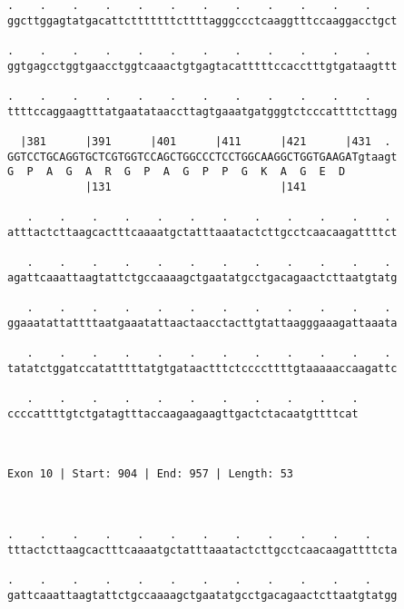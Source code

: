 \documentclass{article}
\begin{document}
\begin{Verbatim}
.    .    .    .    .    .    .    .    .    .    .    .    
ggcttggagtatgacattctttttttcttttagggccctcaaggtttccaaggacctgct
                                                            
.    .    .    .    .    .    .    .    .    .    .    .    
ggtgagcctggtgaacctggtcaaactgtgagtacatttttccacctttgtgataagttt
                                                            
.    .    .    .    .    .    .    .    .    .    .    .    
ttttccaggaagtttatgaatataaccttagtgaaatgatgggtctcccattttcttagg
                                                            
  |381      |391      |401      |411      |421      |431  . 
GGTCCTGCAGGTGCTCGTGGTCCAGCTGGCCCTCCTGGCAAGGCTGGTGAAGATgtaagt
G  P  A  G  A  R  G  P  A  G  P  P  G  K  A  G  E  D        
            |131                          |141              
  
   .    .    .    .    .    .    .    .    .    .    .    . 
atttactcttaagcactttcaaaatgctatttaaatactcttgcctcaacaagattttct
                                                            
   .    .    .    .    .    .    .    .    .    .    .    . 
agattcaaattaagtattctgccaaaagctgaatatgcctgacagaactcttaatgtatg
                                                            
   .    .    .    .    .    .    .    .    .    .    .    . 
ggaaatattattttaatgaaatattaactaacctacttgtattaagggaaagattaaata
                                                            
   .    .    .    .    .    .    .    .    .    .    .    . 
tatatctggatccatatttttatgtgataactttctccccttttgtaaaaaccaagattc
                                                            
   .    .    .    .    .    .    .    .    .    .    .
ccccattttgtctgatagtttaccaagaagaagttgactctacaatgttttcat
                                                      
                                                      
 
Exon 10 | Start: 904 | End: 957 | Length: 53



.    .    .    .    .    .    .    .    .    .    .    .    
tttactcttaagcactttcaaaatgctatttaaatactcttgcctcaacaagattttcta
                                                            
.    .    .    .    .    .    .    .    .    .    .    .    
gattcaaattaagtattctgccaaaagctgaatatgcctgacagaactcttaatgtatgg
                                                            

\end{Verbatim}
\end{document}
